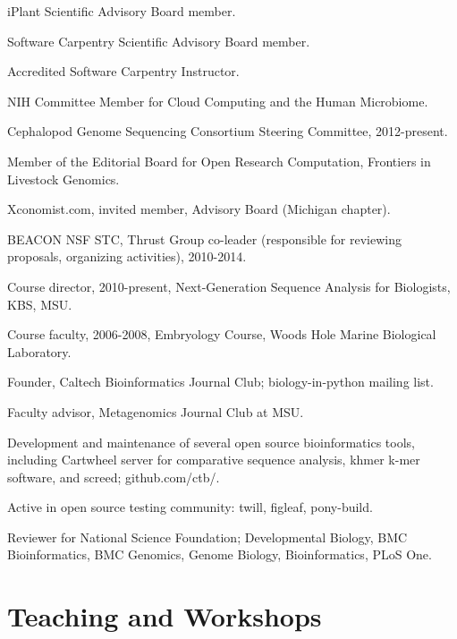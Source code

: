 \documentclass[margin,line]{resume}
\begin{document}
\begin{resume}
\begin{list1}
\item[] iPlant Scientific Advisory Board member.
\item[] Software Carpentry Scientific Advisory Board member.
\item[] Accredited Software Carpentry Instructor.
\item[] NIH Committee Member for Cloud Computing and the Human Microbiome.
\item[] Cephalopod Genome Sequencing Consortium Steering Committee, 2012-present.
\item[] Member of the Editorial Board for Open Research Computation,
Frontiers in Livestock Genomics.
\item[] Xconomist.com, invited member, Advisory Board (Michigan chapter).
\item[] BEACON NSF STC, Thrust Group co-leader (responsible for reviewing
proposals, organizing activities), 2010-2014.
\item[] Course director, 2010-present, Next-Generation Sequence Analysis for Biologists, KBS, MSU.
\item[] Course faculty, 2006-2008, Embryology Course, Woods Hole Marine Biological Laboratory.
\item[] Founder, Caltech Bioinformatics Journal Club; biology-in-python
mailing list.
\item[] Faculty advisor, Metagenomics Journal Club at MSU.
\item[] Development and maintenance of several open source bioinformatics tools, including
Cartwheel server for comparative sequence analysis, khmer k-mer software,
and screed; github.com/ctb/.
\item[] Active in open source testing community: twill, figleaf, pony-build.
\item[] Reviewer for National Science Foundation; Developmental Biology, BMC Bioinformatics, BMC Genomics, Genome Biology, Bioinformatics, PLoS One.
\end{list1}

\section{\mysidestyle Teaching and Workshops}

\begin{list1}


\end{list1}
\end{resume}
\end{document}
